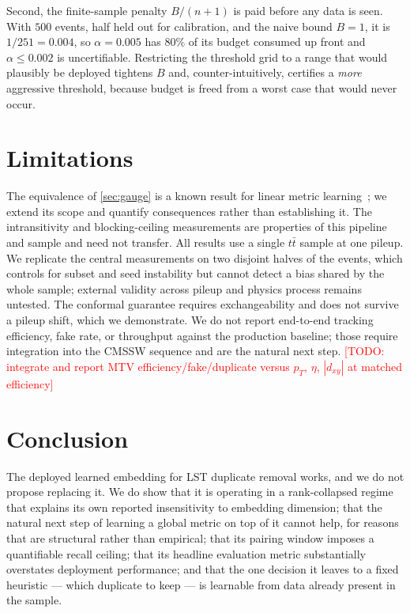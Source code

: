 \documentclass[11pt]{article}
\newcommand{\todo}[1]{\textcolor{red}{[TODO: #1]}}
\begin{document}
Second, the finite-sample penalty $B/(n+1)$ is paid before any data is seen. With
$500$ events, half held out for calibration, and the naive bound $B=1$, it is
$1/251 = 0.004$, so $\alpha=0.005$ has $80\%$ of its budget consumed up front and
$\alpha \le 0.002$ is uncertifiable. Restricting the threshold grid to a range
that would plausibly be deployed tightens $B$ and, counter-intuitively, certifies
a \emph{more} aggressive threshold, because budget is freed from a worst case that
would never occur.




\section{Limitations}
\label{sec:limitations}

The equivalence of \cref{sec:gauge} is a known result for linear metric
learning~\cite{lmnn,kulis2013}; we extend its scope and quantify consequences
rather than establishing it. The intransitivity and blocking-ceiling
measurements are properties of this pipeline and sample and need not transfer.
All results use a single $t\bar{t}$ sample at one pileup. We replicate the
central measurements on two disjoint halves of the events, which controls for
subset and seed instability but cannot detect a bias shared by the whole sample;
external validity across pileup and physics process remains untested. The
conformal guarantee requires exchangeability and does not survive a pileup shift,
which we demonstrate. We do not report end-to-end tracking efficiency, fake rate, or
throughput against the production baseline; those require integration into the
CMSSW sequence and are the natural next step. \todo{integrate and report MTV
efficiency/fake/duplicate versus $p_T$, $\eta$, $|d_{xy}|$ at matched efficiency}

\section{Conclusion}

The deployed learned embedding for LST duplicate removal works, and we do not
propose replacing it. We do show that it is operating in a rank-collapsed regime
that explains its own reported insensitivity to embedding dimension; that the
natural next step of learning a global metric on top of it cannot help, for
reasons that are structural rather than empirical; that its pairing window
imposes a quantifiable recall ceiling; that its headline evaluation metric
substantially overstates deployment performance; and that the one decision it
leaves to a fixed heuristic --- which duplicate to keep --- is learnable from
data already present in the sample.
\end{document}

